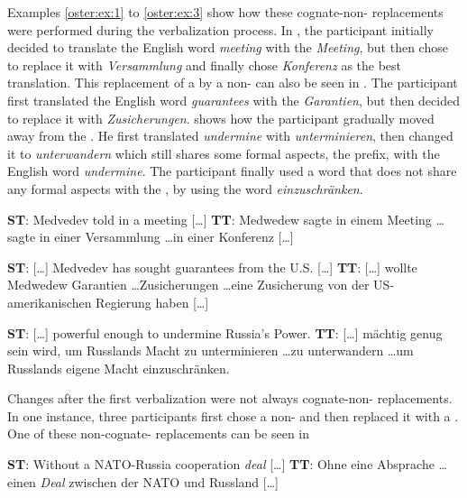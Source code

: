 \documentclass[output=paper]{LSP/langsci}
\begin{document}
Examples \ref{oster:ex:1} to \ref{oster:ex:3} show how these cognate-non- replacements were performed during the verbalization process. In , the participant initially decided to translate the English word \textit{meeting} with the   \textit{Meeting}, but then chose to replace it with \textit{Versammlung} and finally chose \textit{Konferenz} as the best translation. This replacement of a  by a non- can also be seen in . The participant first translated the English word \textit{guarantees} with the   \textit{Garantien}, but then decided to replace it with \textit{Zusicherungen}.  shows how the participant gradually moved away from the . He first translated \textit{undermine} with \textit{unterminieren}, then changed it to \textit{unterwandern} which still shares some formal aspects, the prefix, with the English word \textit{undermine}. The participant finally used a word that does not share any formal aspects with the , by using the  word \textit{einzuschränken}.

\ea%
    \label{oster:ex:1}
    \glt \textbf{ST}: Medvedev told in a meeting [\ldots]
    \glt \textbf{TT}: Medwedew sagte in einem Meeting \ldots sagte in einer Versammlung \ldots in einer Konferenz [\ldots]
    \z

\ea%
    \label{oster:ex:2}
    \glt \textbf{ST}: [\ldots] Medvedev has sought guarantees from the U.S. [\ldots]
    \glt \textbf{TT}: [\ldots] wollte Medwedew Garantien \ldots Zusicherungen \ldots eine Zusicherung von der US-amerikanischen Regierung haben [\ldots]
\z

\ea%
    \label{oster:ex:3}
    \glt \textbf{ST}: [\ldots] powerful enough to undermine Russia's Power.
    \glt \textbf{TT}: [\ldots] mächtig genug sein wird, um Russlands Macht zu unterminieren \ldots zu unterwandern \ldots um Russlands eigene Macht einzuschränken. 
\z

Changes after the first verbalization were not always cognate-non- replacements. In one instance, three participants first chose a non- and then replaced it with a . One of these non-cognate- replacements can be seen in 

\ea%
    \label{oster:ex:4}
    \glt \textbf{ST}: Without a NATO-Russia cooperation \textit{deal} [\ldots]
    \glt \textbf{TT}: Ohne eine Absprache \ldots einen \textit{Deal} zwischen der NATO und Russland [\ldots]
\z
\end{document}
